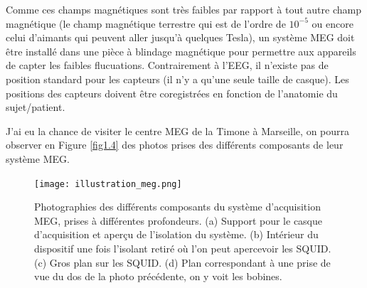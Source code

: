 Comme ces champs magnétiques sont très faibles par rapport à tout autre champ magnétique (le champ magnétique terrestre qui est de l'ordre de $10^{-5}$ ou encore celui d'aimants qui peuvent aller jusqu'à quelques Tesla), un système MEG doit être installé dans une pièce à blindage magnétique pour permettre aux appareils de capter les faibles flucuations. Contrairement à l'EEG, il n'existe pas de position standard pour les capteurs (il n'y a qu'une seule taille de casque). Les positions des capteurs doivent être coregistrées en fonction de l'anatomie du sujet/patient. 

J'ai eu la chance de visiter le centre MEG de la Timone à Marseille, on pourra observer en Figure \ref{fig1.4} des photos prises des différents composants de leur système MEG.

\begin{figure}[!ht]
    \centering
    \texttt{[image: illustration\_meg.png]}
    \caption{Photographies des différents composants du système d'acquisition MEG, prises à différentes profondeurs. (a) Support pour le casque d'acquisition et aperçu de l'isolation du système. (b) Intérieur du dispositif une fois l'isolant retiré où l'on peut apercevoir les SQUID. (c) Gros plan sur les SQUID. (d) Plan correspondant à une prise de vue du dos de la photo précédente, on y voit les bobines.}
    \label{fig1.3}
\end{figure}

